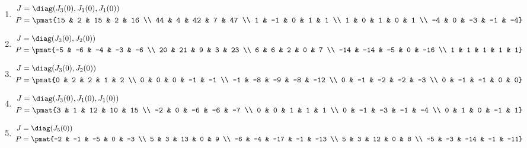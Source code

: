 \begin{enumerate}
\item

\begin{align*}
J &= \diag(J_{3}(0), J_{1}(0), J_{1}(0))\\
P &= \pmat{15 & 2 & 15 & 2 & 16 \\ 44 & 4 & 42 & 7 & 47 \\ 1 & -1 & 0 & 1 & 1 \\ 1 & 0 & 1 & 0 & 1 \\ -4 & 0 & -3 & -1 & -4}
\end{align*}

\item

\begin{align*}
J &= \diag(J_{3}(0), J_{2}(0))\\
P &= \pmat{-5 & -6 & -4 & -3 & -6 \\ 20 & 21 & 9 & 3 & 23 \\ 6 & 6 & 2 & 0 & 7 \\ -14 & -14 & -5 & 0 & -16 \\ 1 & 1 & 1 & 1 & 1}
\end{align*}

\item

\begin{align*}
J &= \diag(J_{3}(0), J_{2}(0))\\
P &= \pmat{0 & 2 & 2 & 1 & 2 \\ 0 & 0 & 0 & -1 & -1 \\ -1 & -8 & -9 & -8 & -12 \\ 0 & -1 & -2 & -2 & -3 \\ 0 & -1 & -1 & 0 & 0}
\end{align*}

\item

\begin{align*}
J &= \diag(J_{3}(0), J_{1}(0), J_{1}(0))\\
P &= \pmat{3 & 1 & 12 & 10 & 15 \\ -2 & 0 & -6 & -6 & -7 \\ 0 & 0 & 1 & 1 & 1 \\ 0 & -1 & -3 & -1 & -4 \\ 0 & 1 & 0 & -1 & 1}
\end{align*}

\item

\begin{align*}
J &= \diag(J_{5}(0))\\
P &= \pmat{-2 & -1 & -5 & 0 & -3 \\ 5 & 3 & 13 & 0 & 9 \\ -6 & -4 & -17 & -1 & -13 \\ 5 & 3 & 12 & 0 & 8 \\ -5 & -3 & -14 & -1 & -11}
\end{align*}


\end{enumerate}

